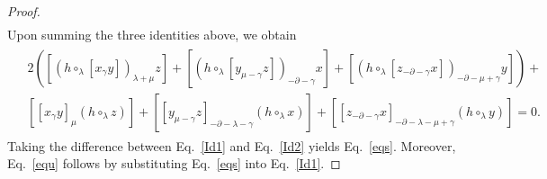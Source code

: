 \documentclass[11pt,letterpaper,reqno]{amsart}
\theoremstyle{definition}
\numberwithin{equation}{section}
\begin{document}
\begin{proof}
\begin{align*}
   \end{align*}
Upon summing the three identities above, we obtain
   \begin{eqnarray}
      \begin{aligned}\label{Id2}
      &2\left([(h\circ_{\lambda}[x_{\gamma}y])_{\lambda+\mu}z]+[(h\circ_{\lambda}[y_{\mu-\gamma}z])_{-\partial-\gamma}x]+[(h\circ_{\lambda}[z_{-\partial-\gamma}x])_{-\partial-\mu+\gamma}y]\right)+ \\
      &[[x_{\gamma}y]_{\mu}(h\circ_{\lambda}z)]+[[y_{\mu-\gamma}z]_{-\partial-\lambda-\gamma}(h\circ_{\lambda}x)]+[[z_{-\partial-\gamma}x]_{-\partial-\lambda-\mu+\gamma}(h\circ_{\lambda}y)]=0.
      \end{aligned}
   \end{eqnarray}
Taking the difference between Eq.~\eqref{Id1} and Eq.~\eqref{Id2} yields Eq.~\eqref{eqs}.
Moreover, Eq.~\eqref{equ} follows by substituting Eq.~\eqref{eqs} into Eq.~\eqref{Id1}.


\end{proof}
\end{document}

